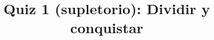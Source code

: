 \documentclass{doc}
\title{Quiz 1 (supletorio): Dividir y conquistar}
\begin{document}
\makedocheader
\quizidentification

\quizback
\end{document}
